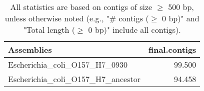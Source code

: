 \documentclass[12pt,a4paper]{article}
\begin{document}
\begin{table}[ht]
\begin{center}
\caption{All statistics are based on contigs of size $\geq$ 500 bp, unless otherwise noted (e.g., "\# contigs ($\geq$ 0 bp)" and "Total length ($\geq$ 0 bp)" include all contigs).}
\begin{tabular}{|l*{1}{|r}|}
\hline
Assemblies & final.contigs \\ \hline
Escherichia\_coli\_O157\_H7\_0930 & 99.500 \\ \hline
Escherichia\_coli\_O157\_H7\_ancestor & 94.458 \\ \hline
\end{tabular}
\end{center}
\end{table}
\end{document}
